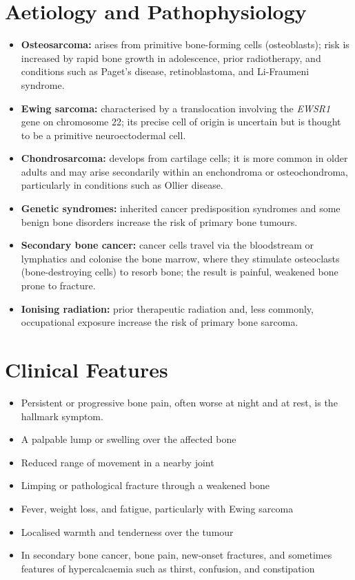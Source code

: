 \section*{Aetiology and Pathophysiology}
\begin{itemize}
    \item \textbf{Osteosarcoma:} arises from primitive bone-forming cells (osteoblasts); risk is increased by rapid bone growth in adolescence, prior radiotherapy, and conditions such as Paget's disease, retinoblastoma, and Li-Fraumeni syndrome.
    \item \textbf{Ewing sarcoma:} characterised by a translocation involving the \textit{EWSR1} gene on chromosome 22; its precise cell of origin is uncertain but is thought to be a primitive neuroectodermal cell.
    \item \textbf{Chondrosarcoma:} develops from cartilage cells; it is more common in older adults and may arise secondarily within an enchondroma or osteochondroma, particularly in conditions such as Ollier disease.
    \item \textbf{Genetic syndromes:} inherited cancer predisposition syndromes and some benign bone disorders increase the risk of primary bone tumours.
    \item \textbf{Secondary bone cancer:} cancer cells travel via the bloodstream or lymphatics and colonise the bone marrow, where they stimulate osteoclasts (bone-destroying cells) to resorb bone; the result is painful, weakened bone prone to fracture.
    \item \textbf{Ionising radiation:} prior therapeutic radiation and, less commonly, occupational exposure increase the risk of primary bone sarcoma.
\end{itemize}

\section*{Clinical Features}
\begin{itemize}
    \item Persistent or progressive bone pain, often worse at night and at rest, is the hallmark symptom.
    \item A palpable lump or swelling over the affected bone
    \item Reduced range of movement in a nearby joint
    \item Limping or pathological fracture through a weakened bone
    \item Fever, weight loss, and fatigue, particularly with Ewing sarcoma
    \item Localised warmth and tenderness over the tumour
    \item In secondary bone cancer, bone pain, new-onset fractures, and sometimes features of hypercalcaemia such as thirst, confusion, and constipation
\end{itemize}

